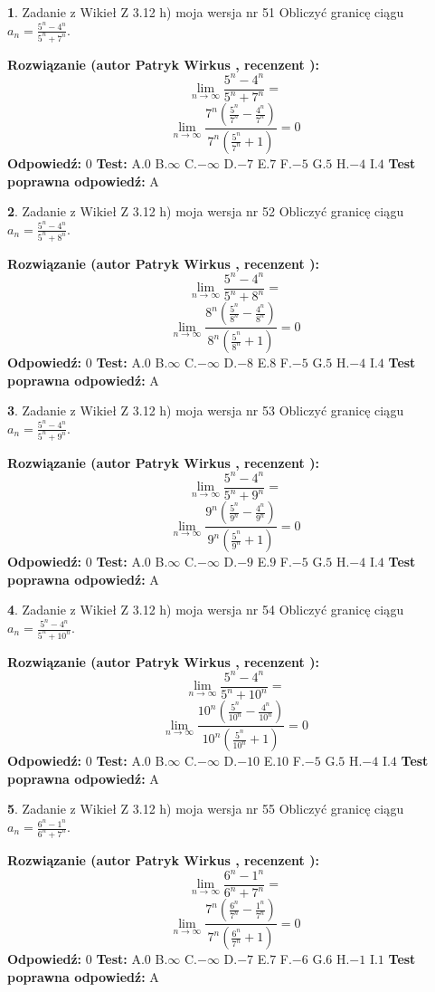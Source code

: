 \documentclass[12pt, a4paper]{article}
\theoremstyle{definition} %
\newtheorem{zad}{}
\newcommand{\zadStart}[1]{\begin{zad}#1\newline}
\newcommand{\zadStop}{\end{zad}}
\newcommand{\rozwStart}[2]{\noindent \textbf{Rozwiązanie (autor #1 , recenzent #2): }\newline}
\newcommand{\rozwStop}{\newline}
\newcommand{\odpStart}{\noindent \textbf{Odpowiedź:}\newline}
\newcommand{\odpStop}{\newline}
\newcommand{\testStart}{\noindent \textbf{Test:}\newline}
\newcommand{\testStop}{\newline}
\newcommand{\kluczStart}{\noindent \textbf{Test poprawna odpowiedź:}\newline}
\newcommand{\kluczStop}{\newline}
\begin{document}
\zadStart{Zadanie z Wikieł Z 3.12 h) moja wersja nr 51}
Obliczyć granicę ciągu $a_{n}=\frac{5^{n} - 4^{n}}{5^{n} + 7^{n}}$.
\zadStop
\rozwStart{Patryk Wirkus}{}
$$\lim\limits_{n\to\infty}\frac{5^{n} - 4^{n}}{5^{n} + 7^{n}}=$$
$$\lim\limits_{n\to\infty}\frac{7^{n}(\frac{5^{n}}{7^{n}} - \frac{4^{n}}{7^{n}})}{7^{n}(\frac{5^{n}}{7^{n}} + 1)} = 0$$
\rozwStop
\odpStart
$0$
\odpStop
\testStart
A.$0$
B.$\infty$
C.$-\infty$
D.$-7$
E.$7$
F.$-5$
G.$5$
H.$-4$
I.$4$
\testStop
\kluczStart
A
\kluczStop



\zadStart{Zadanie z Wikieł Z 3.12 h) moja wersja nr 52}
Obliczyć granicę ciągu $a_{n}=\frac{5^{n} - 4^{n}}{5^{n} + 8^{n}}$.
\zadStop
\rozwStart{Patryk Wirkus}{}
$$\lim\limits_{n\to\infty}\frac{5^{n} - 4^{n}}{5^{n} + 8^{n}}=$$
$$\lim\limits_{n\to\infty}\frac{8^{n}(\frac{5^{n}}{8^{n}} - \frac{4^{n}}{8^{n}})}{8^{n}(\frac{5^{n}}{8^{n}} + 1)} = 0$$
\rozwStop
\odpStart
$0$
\odpStop
\testStart
A.$0$
B.$\infty$
C.$-\infty$
D.$-8$
E.$8$
F.$-5$
G.$5$
H.$-4$
I.$4$
\testStop
\kluczStart
A
\kluczStop



\zadStart{Zadanie z Wikieł Z 3.12 h) moja wersja nr 53}
Obliczyć granicę ciągu $a_{n}=\frac{5^{n} - 4^{n}}{5^{n} + 9^{n}}$.
\zadStop
\rozwStart{Patryk Wirkus}{}
$$\lim\limits_{n\to\infty}\frac{5^{n} - 4^{n}}{5^{n} + 9^{n}}=$$
$$\lim\limits_{n\to\infty}\frac{9^{n}(\frac{5^{n}}{9^{n}} - \frac{4^{n}}{9^{n}})}{9^{n}(\frac{5^{n}}{9^{n}} + 1)} = 0$$
\rozwStop
\odpStart
$0$
\odpStop
\testStart
A.$0$
B.$\infty$
C.$-\infty$
D.$-9$
E.$9$
F.$-5$
G.$5$
H.$-4$
I.$4$
\testStop
\kluczStart
A
\kluczStop



\zadStart{Zadanie z Wikieł Z 3.12 h) moja wersja nr 54}
Obliczyć granicę ciągu $a_{n}=\frac{5^{n} - 4^{n}}{5^{n} + 10^{n}}$.
\zadStop
\rozwStart{Patryk Wirkus}{}
$$\lim\limits_{n\to\infty}\frac{5^{n} - 4^{n}}{5^{n} + 10^{n}}=$$
$$\lim\limits_{n\to\infty}\frac{10^{n}(\frac{5^{n}}{10^{n}} - \frac{4^{n}}{10^{n}})}{10^{n}(\frac{5^{n}}{10^{n}} + 1)} = 0$$
\rozwStop
\odpStart
$0$
\odpStop
\testStart
A.$0$
B.$\infty$
C.$-\infty$
D.$-10$
E.$10$
F.$-5$
G.$5$
H.$-4$
I.$4$
\testStop
\kluczStart
A
\kluczStop



\zadStart{Zadanie z Wikieł Z 3.12 h) moja wersja nr 55}
Obliczyć granicę ciągu $a_{n}=\frac{6^{n} - 1^{n}}{6^{n} + 7^{n}}$.
\zadStop
\rozwStart{Patryk Wirkus}{}
$$\lim\limits_{n\to\infty}\frac{6^{n} - 1^{n}}{6^{n} + 7^{n}}=$$
$$\lim\limits_{n\to\infty}\frac{7^{n}(\frac{6^{n}}{7^{n}} - \frac{1^{n}}{7^{n}})}{7^{n}(\frac{6^{n}}{7^{n}} + 1)} = 0$$
\rozwStop
\odpStart
$0$
\odpStop
\testStart
A.$0$
B.$\infty$
C.$-\infty$
D.$-7$
E.$7$
F.$-6$
G.$6$
H.$-1$
I.$1$
\testStop
\kluczStart
A
\kluczStop
\end{document}

